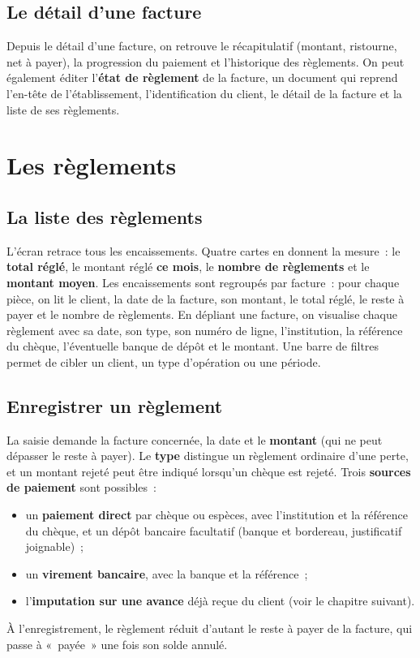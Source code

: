 \section{Le détail d'une facture}
Depuis le détail d'une facture, on retrouve le récapitulatif (montant, ristourne, net à payer), la progression du paiement et l'historique des règlements. On peut également éditer l'\textbf{état de règlement} de la facture, un document qui reprend l'en-tête de l'établissement, l'identification du client, le détail de la facture et la liste de ses règlements.

\chapter{Les règlements}

\section{La liste des règlements}
L'écran  retrace tous les encaissements. Quatre cartes en donnent la mesure~: le \textbf{total réglé}, le montant réglé \textbf{ce mois}, le \textbf{nombre de règlements} et le \textbf{montant moyen}. Les encaissements sont regroupés par facture~: pour chaque pièce, on lit le client, la date de la facture, son montant, le total réglé, le reste à payer et le nombre de règlements. En dépliant une facture, on visualise chaque règlement avec sa date, son type, son numéro de ligne, l'institution, la référence du chèque, l'éventuelle banque de dépôt et le montant. Une barre de filtres permet de cibler un client, un type d'opération ou une période.


\section{Enregistrer un règlement}
La saisie demande la facture concernée, la date et le \textbf{montant} (qui ne peut dépasser le reste à payer). Le \textbf{type} distingue un règlement ordinaire d'une perte, et un montant rejeté peut être indiqué lorsqu'un chèque est rejeté. Trois \textbf{sources de paiement} sont possibles~:
\begin{itemize}
  \item un \textbf{paiement direct} par chèque ou espèces, avec l'institution et la référence du chèque, et un dépôt bancaire facultatif (banque et bordereau, justificatif joignable)~;
  \item un \textbf{virement bancaire}, avec la banque et la référence~;
  \item l'\textbf{imputation sur une avance} déjà reçue du client (voir le chapitre suivant).
\end{itemize}
À l'enregistrement, le règlement réduit d'autant le reste à payer de la facture, qui passe à «~payée~» une fois son solde annulé.

